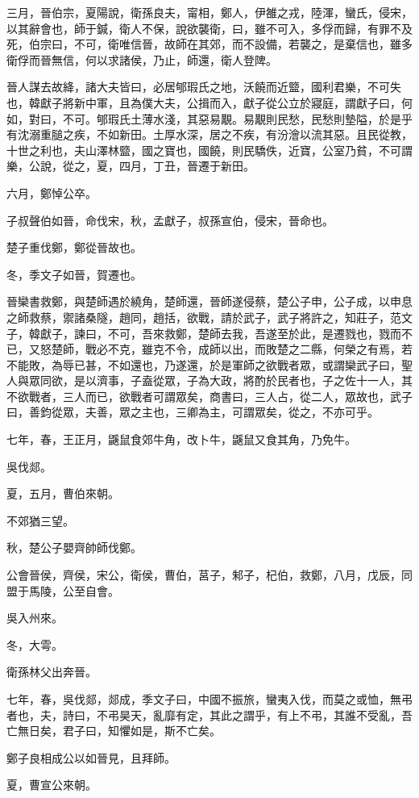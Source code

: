 \begin{pinyinscope}
三月，晉伯宗，夏陽說，衛孫良夫，甯相，鄭人，伊雒之戎，陸渾，蠻氏，侵宋，以其辭會也，師于鍼，衛人不保，說欲襲衛，曰，雖不可入，多俘而歸，有罪不及死，伯宗曰，不可，衛唯信晉，故師在其郊，而不設備，若襲之，是棄信也，雖多衛俘而晉無信，何以求諸侯，乃止，師還，衛人登陴。

晉人謀去故絳，諸大夫皆曰，必居郇瑕氏之地，沃饒而近盬，國利君樂，不可失也，韓獻子將新中軍，且為僕大夫，公揖而入，獻子從公立於寢庭，謂獻子曰，何如，對曰，不可。郇瑕氏土薄水淺，其惡易覯。易覯則民愁，民愁則墊隘，於是乎有沈溺重膇之疾，不如新田。土厚水深，居之不疾，有汾澮以流其惡。且民從教，十世之利也，夫山澤林盬，國之寶也，國饒，則民驕佚，近寶，公室乃貧，不可謂樂，公說，從之，夏，四月，丁丑，晉遷于新田。

六月，鄭悼公卒。

子叔聲伯如晉，命伐宋，秋，孟獻子，叔孫宣伯，侵宋，晉命也。

楚子重伐鄭，鄭從晉故也。

冬，季文子如晉，賀遷也。

晉欒書救鄭，與楚師遇於繞角，楚師還，晉師遂侵蔡，楚公子申，公子成，以申息之師救蔡，禦諸桑隧，趙同，趙括，欲戰，請於武子，武子將許之，知莊子，范文子，韓獻子，諫曰，不可，吾來救鄭，楚師去我，吾遂至於此，是遷戮也，戮而不已，又怒楚師，戰必不克，雖克不令，成師以出，而敗楚之二縣，何榮之有焉，若不能敗，為辱已甚，不如還也，乃遂還，於是軍師之欲戰者眾，或謂欒武子曰，聖人與眾同欲，是以濟事，子盍從眾，子為大政，將酌於民者也，子之佐十一人，其不欲戰者，三人而已，欲戰者可謂眾矣，商書曰，三人占，從二人，眾故也，武子曰，善鈞從眾，夫善，眾之主也，三卿為主，可謂眾矣，從之，不亦可乎。

七年，春，王正月，鼷鼠食郊牛角，改卜牛，鼷鼠又食其角，乃免牛。

吳伐郯。

夏，五月，曹伯來朝。

不郊猶三望。

秋，楚公子嬰齊帥師伐鄭。

公會晉侯，齊侯，宋公，衛侯，曹伯，莒子，邾子，杞伯，救鄭，八月，戊辰，同盟于馬陵，公至自會。

吳入州來。

冬，大雩。

衛孫林父出奔晉。

七年，春，吳伐郯，郯成，季文子曰，中國不振旅，蠻夷入伐，而莫之或恤，無弔者也，夫，詩曰，不弔昊天，亂靡有定，其此之謂乎，有上不弔，其誰不受亂，吾亡無日矣，君子曰，知懼如是，斯不亡矣。

鄭子良相成公以如晉見，且拜師。

夏，曹宣公來朝。


\end{pinyinscope}
